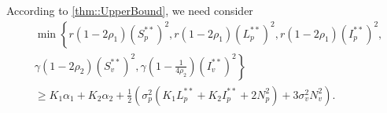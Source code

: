 \begin{hyp}\label{eqn::hypLowerBound}
    According to \autoref{thm::UpperBound}, we need consider  
	\begin{align*}
		&
		\min
			\left\{
			r (1 - 2 \rho_1) (S_p ^{**}) ^ 2,
			r (1 - 2 \rho_1) (L_p ^{**}) ^ 2, 
			r(1 - 2 \rho_1) (I_p ^ {**}) ^ 2,
		\right.
		\\
		&
		\left.
		 	\gamma 
		 	(1 - 2 \rho_2) (S_v ^{**} ) ^ 2,
		 	\gamma
		 	\left(
		 		1 - 
		 		\frac{1}{4 \rho_2}
		 	\right)
		 	(I_v ^{**} ) ^ 2
		\right\}
		\\
		& \geq 
		K_1 \alpha_1 + 
		K_2 \alpha_2 + 
		\frac{1}{2}
		\left(
		 	\sigma_p ^ 2
		 	\left(
		 		K_1 L_p ^{**} +
		 		K_2 I_p ^{**} + 
		 		2N_p ^2 
		 	\right) + 
		 	3 \sigma_v ^ 2 N_v ^ 2
		\right).
	\end{align*} 
\end{hyp}

